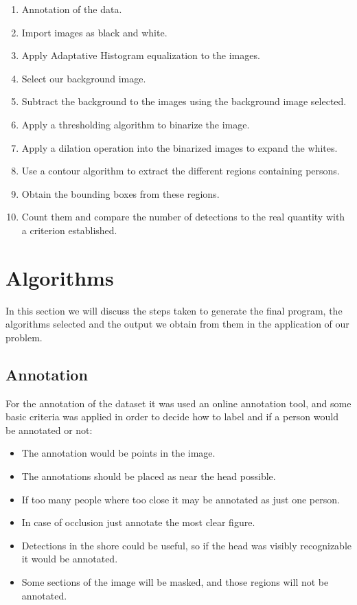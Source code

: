 \documentclass[10pt]{article}
\begin{document}
\begin{enumerate}
  \item Annotation of the data.
  \item Import images as black and white.
  \item Apply Adaptative Histogram equalization to the images.
  \item Select our background image.
  \item Subtract the background to the images using the background image selected.
  \item Apply a thresholding algorithm to binarize the image.
  \item Apply a dilation operation into the binarized images to expand the whites.
  \item Use a contour algorithm to extract the different regions containing persons.
  \item Obtain the bounding boxes from these regions.
  \item Count them and compare the number of detections to the real quantity with a criterion established.
\end{enumerate}

\section{Algorithms}
In this section we will discuss the steps taken to generate the final program, the algorithms selected and the output we obtain from them in the application of our problem.

\subsection{Annotation}

For the annotation of the dataset it was used an online annotation tool, and some basic criteria was applied in order to decide how to label and if a person would be annotated or not:
\begin{itemize}
  \item The annotation would be points in the image.
  \item The annotations should be placed as near the head possible.
  \item If too many people where too close it may be annotated as just one person.
  \item In case of occlusion just annotate the most clear figure.
  \item Detections in the shore could be useful, so if the head was visibly recognizable it would be annotated.
  \item Some sections of the image will be masked, and those regions will not be annotated.
\end{itemize}
\end{document}
